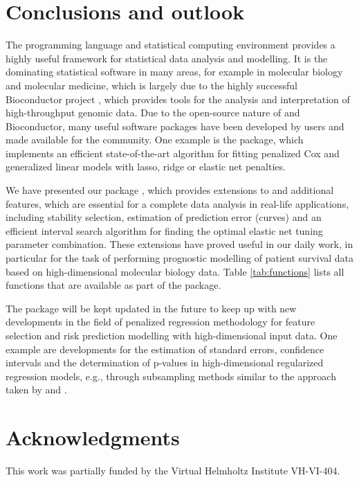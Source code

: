 \documentclass[nojss]{jss}
\begin{document}
\section{Conclusions and outlook}
The programming language and statistical computing environment  provides a highly useful framework for statistical data analysis and modelling. It is the dominating statistical software in many areas, for example in molecular biology and molecular medicine, which is largely due to the highly successful Bioconductor project \citep{Bioconductor}, which provides tools for the analysis and interpretation of high-throughput genomic data. Due to the open-source nature of  and Bioconductor, many useful software packages have been developed by  users and made available for the  community. One example is the  package, which  implements an efficient state-of-the-art algorithm for fitting penalized Cox and generalized linear models with lasso, ridge or elastic net penalties.

We have presented our  package , which provides extensions to  and additional features, which are essential for a complete data analysis in real-life applications, including stability selection, estimation of prediction error (curves) and an efficient interval search algorithm for finding the optimal elastic net tuning parameter combination. These extensions have proved useful in our daily work, in particular for the task of performing prognostic modelling of patient survival data based on high-dimensional molecular biology data. Table \ref{tab:functions} lists all functions that are available as part of the  package.

The  package will be kept updated in the future to keep up with new developments in the field of penalized regression methodology for feature selection and risk prediction modelling with high-dimensional input data. One example are developments for the estimation of standard errors, confidence intervals and the determination of p-values in high-dimensional regularized regression models, e.g., through subsampling methods similar to the approach taken by \citet{wasserman2009} and \citet{MMB2009}.

\section*{Acknowledgments}

This work was partially funded by the Virtual Helmholtz Institute VH-VI-404.



\end{document}
